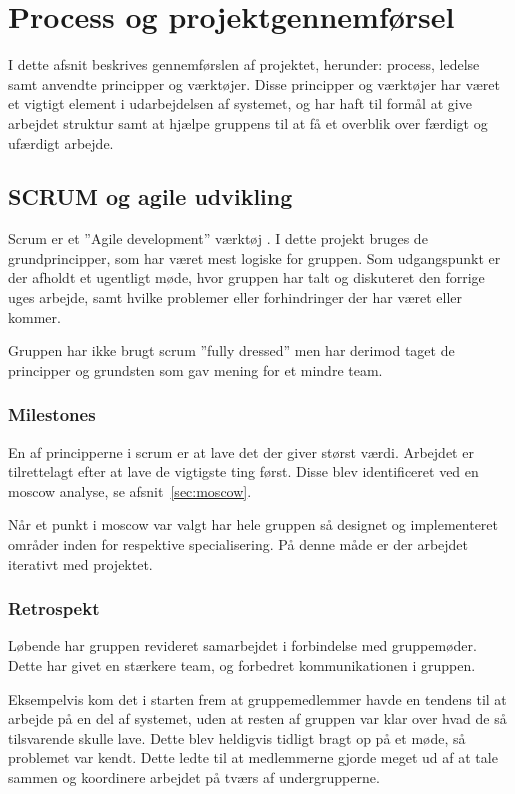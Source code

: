 \chapter{Process og projektgennemførsel}

I dette afsnit beskrives gennemførslen af projektet, herunder: process, ledelse samt anvendte principper og værktøjer. Disse principper og værktøjer har været et vigtigt element i udarbejdelsen af systemet, og har haft til formål at give arbejdet struktur samt at hjælpe gruppens til at få et overblik over færdigt og ufærdigt arbejde.

\section{SCRUM og agile udvikling}
Scrum er et ''Agile development'' værktøj \cite[kap. 1]{robertmartin2006}. I dette projekt bruges de grundprincipper, som har været mest logiske for gruppen. Som udgangspunkt er der afholdt et ugentligt møde, hvor gruppen har talt og diskuteret den forrige uges arbejde, samt hvilke problemer eller forhindringer der har været eller kommer.

Gruppen har ikke brugt scrum ''fully dressed'' men har derimod taget de principper og grundsten som gav mening for et mindre team.

\subsection{Milestones}
En af principperne i scrum er at lave det der giver størst værdi. Arbejdet er tilrettelagt efter at lave de vigtigste ting først. Disse blev identificeret ved en \gls{moscow} analyse, se afsnit~\ref{sec:moscow}.

Når et punkt i \gls{moscow} var valgt har hele gruppen så designet og implementeret områder inden for respektive specialisering. På denne måde er der arbejdet iterativt med projektet.

\subsection{Retrospekt}
Løbende har gruppen revideret samarbejdet i forbindelse med gruppemøder. Dette har givet en stærkere team, og forbedret kommunikationen i gruppen.

Eksempelvis kom det i starten frem at gruppemedlemmer havde en tendens til at arbejde på en del af systemet, uden at resten af gruppen var klar over hvad de så tilsvarende skulle lave.
Dette blev heldigvis tidligt bragt op på et møde, så problemet var kendt. Dette ledte til at medlemmerne gjorde meget ud af at tale sammen og koordinere arbejdet på tværs af undergrupperne.

